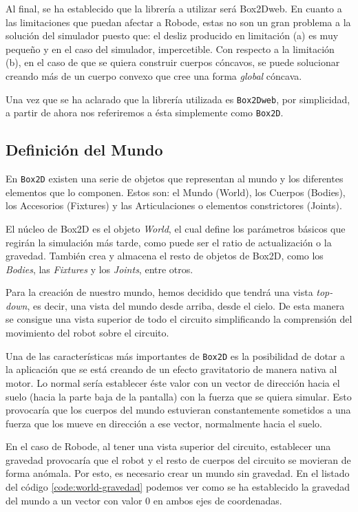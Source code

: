 Al final, se ha establecido que la librería a utilizar será Box2Dweb. En cuanto a las limitaciones que puedan afectar a Robode, estas no son un gran problema a la solución del simulador puesto que: el desliz producido en limitación (a) es muy pequeño y en el caso del simulador, impercetible. Con respecto a la limitación (b), en el caso de que se quiera construir cuerpos cóncavos, se puede solucionar creando más de un cuerpo convexo que cree una forma \emph{global} cóncava.

Una vez que se ha aclarado que la librería utilizada es \texttt{Box2Dweb}, por simplicidad, a partir de ahora nos referiremos a ésta simplemente como \texttt{Box2D}.

\subsection{Definición del Mundo}
\label{sec:definicion-mundo}

En \texttt{Box2D} existen una serie de objetos que representan al mundo y los diferentes elementos que lo componen.  Estos son: el Mundo (World), los Cuerpos (Bodies), los Accesorios (Fixtures) y las Articulaciones o elementos constrictores (Joints).

El núcleo de Box2D es el objeto \emph{World}, el cual define los parámetros básicos que regirán la simulación más tarde, como puede ser el ratio de actualización o la gravedad. También crea y almacena el resto de objetos de Box2D, como los \emph{Bodies}, las \emph{Fixtures} y los \emph{Joints}, entre otros.

Para la creación de nuestro mundo, hemos decidido que tendrá una vista \emph{top-down}, es decir, una vista del mundo desde arriba, desde el cielo. De esta manera se consigue una vista superior de todo el circuito simplificando la comprensión del movimiento del robot sobre el circuito.

Una de las características más importantes de \texttt{Box2D} es la posibilidad de dotar a la aplicación que se está creando de un efecto gravitatorio de manera nativa al motor. Lo normal sería establecer éste valor con un vector de dirección hacia el suelo (hacia la parte baja de la pantalla) con la fuerza que se quiera simular. Esto provocaría que los cuerpos del mundo estuvieran constantemente sometidos a una fuerza que los mueve en dirección a ese vector, normalmente hacia el suelo.  

En el caso de Robode, al tener una vista superior del circuito, establecer una gravedad provocaría que el robot y el resto de cuerpos del circuito se movieran de forma anómala. Por esto, es necesario crear un mundo sin gravedad. En el listado del código \ref{code:world-gravedad} podemos ver como se ha establecido la gravedad del mundo a un vector con valor 0 en ambos ejes de coordenadas. 

